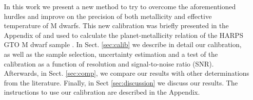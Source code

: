 \documentclass{aa}
\begin{document}
In this work we present a new method to try to overcome the aforementioned hurdles and improve on the precision of both metallicity and effective temperature of M dwarfs. This new calibration was briefly presented in the Appendix of \citet{Neves-2013} and used to calculate the planet-metallicity relation of the HARPS GTO M dwarf sample \citep{Bonfils-2013}. In Sect. \ref{sec:calib} we describe in detail our calibration, as well as the sample selection, uncertainty estimation and a test of the calibration as a function of resolution and signal-to-noise ratio (SNR). Afterwards, in Sect. \ref{sec:comp}, we compare our results with other determinations from the literature. Finally, in Sect \ref{sec:discussion} we discuss our results. The instructions to use our calibration are described in the Appendix. 




\end{document}
